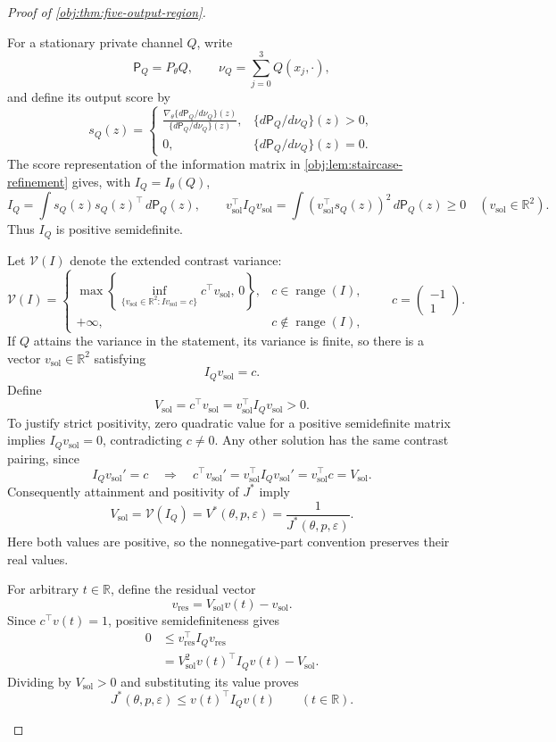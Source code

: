 \begin{proof}[Proof of \cref{obj:thm:five-output-region}]
\begin{enumerate}
For a stationary private channel \(Q\), write
\[
\mathsf P_Q=P_\theta Q,\qquad
\nu_Q=\sum_{j=0}^3Q(x_j,\cdot),
\]
and define its output score by
\[
s_Q(z)=
\begin{cases}
\displaystyle
\frac{\nabla_\theta\{d\mathsf P_Q/d\nu_Q\}(z)}
     {\{d\mathsf P_Q/d\nu_Q\}(z)},
&\{d\mathsf P_Q/d\nu_Q\}(z)>0,\\[6pt]
0,&\{d\mathsf P_Q/d\nu_Q\}(z)=0.
\end{cases}
\]
The score representation of the information matrix in
\cref{obj:lem:staircase-refinement} gives, with
\(I_Q=I_\theta(Q)\),
\[
I_Q=\int s_Q(z)s_Q(z)^\top\,d\mathsf P_Q(z),
\qquad
v_{\mathrm{sol}}^\top I_Qv_{\mathrm{sol}}
=
\int(v_{\mathrm{sol}}^\top s_Q(z))^2\,d\mathsf P_Q(z)\ge0
\quad(v_{\mathrm{sol}}\in\mathbb R^2).
\]
Thus \(I_Q\) is positive semidefinite.

Let \(\mathcal V(I)\) denote the extended contrast variance:
\[
\mathcal V(I)=
\begin{cases}
\displaystyle
\max\!\left\{\inf_{\{v_{\mathrm{sol}}\in\mathbb R^2:
                         Iv_{\mathrm{sol}}=c\}}
                  c^\top v_{\mathrm{sol}},\,0\right\},
&c\in\operatorname{range}(I),\\
+\infty,&c\notin\operatorname{range}(I),
\end{cases}
\qquad
c=\begin{pmatrix}-1\\1\end{pmatrix}.
\]
If \(Q\) attains the variance in the statement, its variance is finite,
so there is a vector \(v_{\mathrm{sol}}\in\mathbb R^2\) satisfying
\[
I_Qv_{\mathrm{sol}}=c.
\]
Define
\[
V_{\mathrm{sol}}=c^\top v_{\mathrm{sol}}
=v_{\mathrm{sol}}^\top I_Qv_{\mathrm{sol}}>0.
\]
To justify strict positivity, zero quadratic value for a positive
semidefinite matrix implies \(I_Qv_{\mathrm{sol}}=0\), contradicting
\(c\ne0\). Any other solution has the same contrast pairing, since
\[
I_Qv_{\mathrm{sol}}'=c
\quad\Longrightarrow\quad
c^\top v_{\mathrm{sol}}'
=
v_{\mathrm{sol}}^\top I_Qv_{\mathrm{sol}}'
=
v_{\mathrm{sol}}^\top c
=
V_{\mathrm{sol}}.
\]
Consequently attainment and positivity of \(J^*\) imply
\[
V_{\mathrm{sol}}=\mathcal V(I_Q)
=V^*(\theta,p,\varepsilon)
=\frac1{J^*(\theta,p,\varepsilon)}.
\]
Here both values are positive, so the nonnegative-part convention
preserves their real values.

For arbitrary \(t\in\mathbb R\), define the residual vector
\[
v_{\mathrm{res}}=V_{\mathrm{sol}}v(t)-v_{\mathrm{sol}}.
\]
Since \(c^\top v(t)=1\), positive semidefiniteness gives
\[
\begin{aligned}
0
&\le v_{\mathrm{res}}^\top I_Qv_{\mathrm{res}}\\
&=V_{\mathrm{sol}}^2v(t)^\top I_Qv(t)-V_{\mathrm{sol}}.
\end{aligned}
\]
Dividing by \(V_{\mathrm{sol}}>0\) and substituting its value proves
\[
J^*(\theta,p,\varepsilon)\le v(t)^\top I_Qv(t)
\qquad(t\in\mathbb R).
\]


\end{enumerate}
\end{proof}
